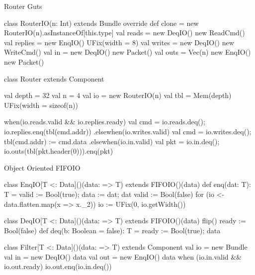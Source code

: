 \documentclass[xcolor=pdflatex,dvipsnames,table]{beamer}
\begin{document}
\begin{frame}[fragile]{Router Guts}

{
\begin{scala}
class RouterIO(n: Int) extends Bundle {
  override def clone = new RouterIO(n).asInstanceOf[this.type]
  val reads   = new DeqIO(){ new ReadCmd() }
  val replies = new EnqIO(){ UFix(width = 8) }
  val writes  = new DeqIO(){ new WriteCmd() }
  val in      = new DeqIO(){ new Packet() }
  val outs    = Vec(n){ new EnqIO(){ new Packet() } }
}

class Router extends Component {
  val depth = 32
  val n     = 4
  val io    = new RouterIO(n)
  val tbl   = Mem(depth){ UFix(width = sizeof(n)) }
  
  when(io.reads.valid && io.replies.ready) { 
    val cmd = io.reads.deq();  io.replies.enq(tbl(cmd.addr))  
  } .elsewhen(io.writes.valid) { 
    val cmd = io.writes.deq(); tbl(cmd.addr) := cmd.data
  } .elsewhen(io.in.valid) {
    val pkt = io.in.deq(); io.outs(tbl(pkt.header(0))).enq(pkt) 
  } 
}
\end{scala}
}
\end{frame}

\begin{frame}[fragile]{Object Oriented FIFOIO}

{
\begin{scala}
class EnqIO[T <: Data]()(data: => T) extends FIFOIO()(data) {
  def enq(dat: T): T = { valid := Bool(true); data := dat; dat }
  valid := Bool(false)
  for (io <- data.flatten.map(x => x._2))
    io := UFix(0, io.getWidth())
}

class DeqIO[T <: Data]()(data: => T) extends FIFOIO()(data) {
  flip()
  ready := Bool(false)
  def deq(b: Boolean = false): T = { ready := Bool(true); data }
}

class Filter[T <: Data]()(data: => T) extends Component {
  val io = new Bundle {
    val in  = new DeqIO(){ data }
    val out = new EnqIO(){ data }
  }
  when (io.in.valid && io.out.ready) {
    io.out.enq(io.in.deq())
  }
}
\end{scala}
}
\end{frame}
\end{document}

